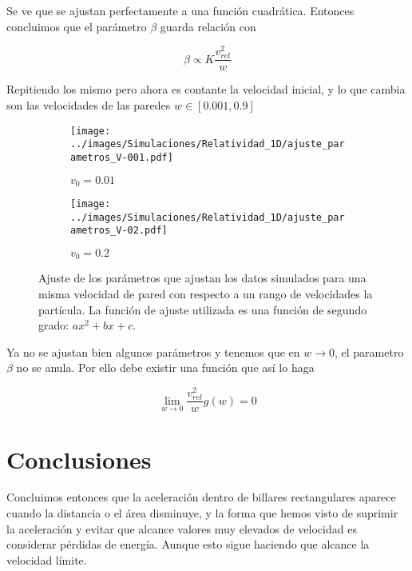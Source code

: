 \documentclass[11pt, spanish]{article}
\begin{document}
Se ve que se ajustan perfectamente a una función cuadrática. Entonces concluimos que el parámetro \( \beta \) guarda relación con

\begin{equation}
    \beta \propto K \dfrac{v^2_{rel}}{w}
\end{equation}

Repitiendo los mismo pero ahora es contante la velocidad inicial, y lo que cambia son las velocidades de las paredes \( w \in [0.001, 0.9] \)

\begin{figure}[h]
    \begin{subfigure}[b]{0.5\textwidth}
        \centering
        \texttt{[image: ../images/Simulaciones/Relatividad\_1D/ajuste\_parametros\_V-001.pdf]}
        \caption{$v_0 = 0.01$}
    \end{subfigure}
    \hfill
    \begin{subfigure}[b]{0.5\textwidth}
        \centering
        \texttt{[image: ../images/Simulaciones/Relatividad\_1D/ajuste\_parametros\_V-02.pdf]}
        \caption{$v_0 = 0.2$}
    \end{subfigure}
    \caption{Ajuste de los parámetros que ajustan los datos simulados para una misma velocidad de pared con respecto a un rango de velocidades la partícula. La función de ajuste utilizada es una función de segundo grado: \( ax^2 + bx + c \).}
    \label{fig:ajuste_parametros_1D_relativity_Vcte}
\end{figure}

Ya no se ajustan bien algunos parámetros y tenemos que en \( w \rightarrow 0\), el parametro \( \beta \) no se anula. Por ello debe existir una función que así lo haga

\begin{equation}
    \lim_{w\rightarrow 0} \dfrac{v^2_{rel}}{w}g(w) = 0
\end{equation}

\section{Conclusiones}

Concluimos entonces que la aceleración dentro de billares rectangulares aparece cuando la distancia o el área disminuye, y la forma que hemos visto de suprimir la aceleración y evitar que alcance valores muy elevados de velocidad es considerar pérdidas de energía. Aunque esto sigue haciendo que alcance la velocidad límite.
\end{document}
